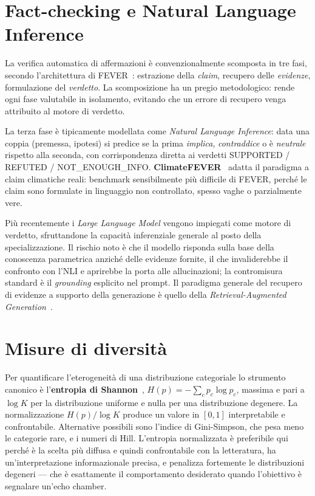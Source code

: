\documentclass[11pt,a4paper]{report}
\begin{document}
\section{Fact-checking e Natural Language Inference}
La verifica automatica di affermazioni è convenzionalmente scomposta in tre fasi, secondo
l'architettura di FEVER~\cite{fever}: estrazione della \emph{claim}, recupero delle
\emph{evidenze}, formulazione del \emph{verdetto}. La scomposizione ha un pregio metodologico:
rende ogni fase valutabile in isolamento, evitando che un errore di recupero venga attribuito
al motore di verdetto.

La terza fase è tipicamente modellata come \emph{Natural Language Inference}: data una coppia
(premessa, ipotesi) si predice se la prima \emph{implica}, \emph{contraddice} o è
\emph{neutrale} rispetto alla seconda, con corrispondenza diretta ai verdetti
SUPPORTED / REFUTED / NOT\_ENOUGH\_INFO. \textbf{ClimateFEVER}~\cite{climatefever} adatta il
paradigma a claim climatiche reali: benchmark sensibilmente più difficile di FEVER, perché le
claim sono formulate in linguaggio non controllato, spesso vaghe o parzialmente vere.

Più recentemente i \emph{Large Language Model} vengono impiegati come motore di verdetto,
sfruttandone la capacità inferenziale generale al posto della specializzazione. Il rischio noto
è che il modello risponda sulla base della conoscenza parametrica anziché delle evidenze
fornite, il che invaliderebbe il confronto con l'NLI e aprirebbe la porta alle allucinazioni;
la contromisura standard è il \emph{grounding} esplicito nel prompt. Il paradigma generale del
recupero di evidenze a supporto della generazione è quello della \emph{Retrieval-Augmented
Generation}~\cite{rag}.

\section{Misure di diversità}\label{sec:sota-diversity}
Per quantificare l'eterogeneità di una distribuzione categoriale lo strumento canonico è
l'\textbf{entropia di Shannon}~\cite{shannon}, $H(p) = -\sum_c p_c \log p_c$, massima e pari a
$\log K$ per la distribuzione uniforme e nulla per una distribuzione degenere. La
normalizzazione $H(p)/\log K$ produce un valore in $[0,1]$ interpretabile e confrontabile.
Alternative possibili sono l'indice di Gini-Simpson, che pesa meno le categorie rare, e i
numeri di Hill. L'entropia normalizzata è preferibile qui perché è la scelta più diffusa e
quindi confrontabile con la letteratura, ha un'interpretazione informazionale precisa, e
penalizza fortemente le distribuzioni degeneri --- che è esattamente il comportamento
desiderato quando l'obiettivo è segnalare un'echo chamber.
\end{document}
